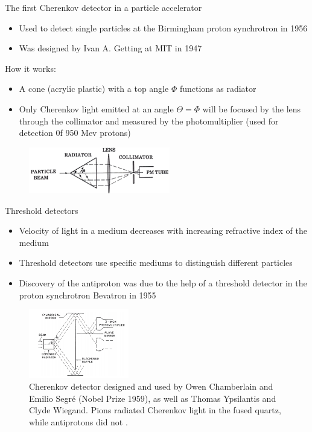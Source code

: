 \documentclass[aspectratio=1610, 10pt]{beamer}
\begin{document}
\begin{frame}{The first Cherenkov detector in a particle accelerator}
  \begin{itemize}
    \item Used to detect single particles at the Birmingham proton synchrotron in 1956
    \medskip
    \item Was designed by Ivan A. Getting at MIT in 1947
  \end{itemize}

How it works:
\begin{itemize}
  \item A cone (acrylic plastic) with a top angle $\Phi$ functions as radiator
  \medskip
  \item Only Cherenkov light emitted at an angle $\Theta = \Phi$ will be focused by the lens through the collimator and measured by the
  photomultiplier (used for detection 0f 950 Mev protons)
\end{itemize}
\begin{figure}
  \includegraphics[width=0.55\textwidth]{images/the_second.png}
\end{figure}
\end{frame}

\begin{frame}{Threshold detectors}
  \begin{itemize}
    \item Velocity of light in a medium decreases with increasing refractive index of the medium
    \medskip
    \item Threshold detectors use specific mediums to distinguish different particles
    \medskip
    \item Discovery of the antiproton was due to the help of a threshold detector in the proton synchrotron Bevatron in 1955
  \end{itemize}
  \begin{figure}
    \includegraphics[width=0.39\textwidth]{images/proton.png}
    \caption{Cherenkov detector designed and used by Owen
     Chamberlain and Emilio Segré (Nobel Prize 1959), as well as Thomas Ypsilantis and Clyde Wiegand.
     Pions radiated Cherenkov light in the fused quartz, while antiprotons did not \cite{gaseous}.}
  \end{figure}
\end{frame}
\end{document}
